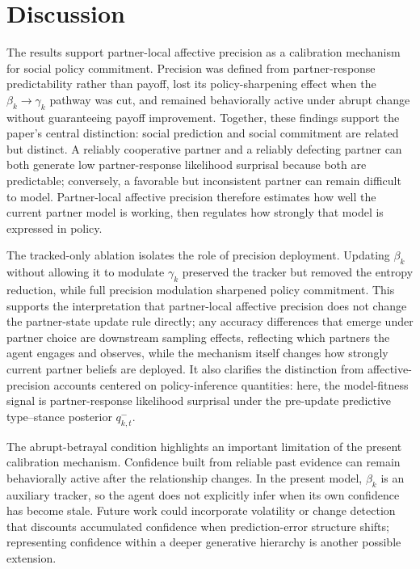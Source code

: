 \section{Discussion}
\label{sec:discussion}

The results support partner-local affective precision as a calibration mechanism for social policy commitment. Precision was defined from partner-response predictability rather than payoff, lost its policy-sharpening effect when the $\beta_k \rightarrow \gamma_k$ pathway was cut, and remained behaviorally active under abrupt change without guaranteeing payoff improvement. Together, these findings support the paper's central distinction: social prediction and social commitment are related but distinct. A reliably cooperative partner and a reliably defecting partner can both generate low partner-response likelihood surprisal because both are predictable; conversely, a favorable but inconsistent partner can remain difficult to model. Partner-local affective precision therefore estimates how well the current partner model is working, then regulates how strongly that model is expressed in policy.

The tracked-only ablation isolates the role of precision deployment. Updating $\beta_k$ without allowing it to modulate $\gamma_k$ preserved the tracker but removed the entropy reduction, while full precision modulation sharpened policy commitment. This supports the interpretation that partner-local affective precision does not change the partner-state update rule directly; any accuracy differences that emerge under partner choice are downstream sampling effects, reflecting which partners the agent engages and observes, while the mechanism itself changes how strongly current partner beliefs are deployed. It also clarifies the distinction from affective-precision accounts centered on policy-inference quantities: here, the model-fitness signal is partner-response likelihood surprisal under the pre-update predictive type--stance posterior $q_{k,t}^-$.

The abrupt-betrayal condition highlights an important limitation of the present calibration mechanism. Confidence built from reliable past evidence can remain behaviorally active after the relationship changes. In the present model, $\beta_k$ is an auxiliary tracker, so the agent does not explicitly infer when its own confidence has become stale. Future work could incorporate volatility or change detection that discounts accumulated confidence when prediction-error structure shifts; representing confidence within a deeper generative hierarchy is another possible extension.

